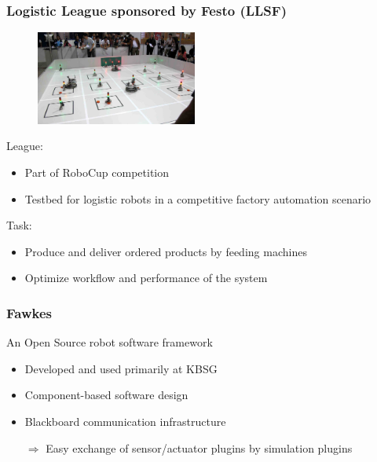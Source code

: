\documentclass[]{beamer}
\begin{document}
\begin{frame}
\frametitle{Logistic League sponsored by Festo (LLSF)}
\fboxsep=0pt
\noindent%
\begin{minipage}[]{0.48\linewidth}
\begin{figure}
\includegraphics[width=150pt,heigth=120pt]{pics/llsfLeague.png}\\
\end{figure}
\end{minipage}%
\hfill%
\begin{minipage}[]{0.48\linewidth}
League:
\begin{itemize}
\item Part of RoboCup competition
\item Testbed for logistic robots in a competitive factory automation scenario
\end{itemize}
\pause
Task:
\begin{itemize}
\item Produce and deliver ordered products by feeding machines%
\item Optimize workflow and performance of the system
\end{itemize}
\end{minipage}
\end{frame}

\begin{frame}
\frametitle{Fawkes}
An Open Source robot software framework
\begin{itemize}
\item Developed and used primarily at KBSG
\item Component-based software design
\item Blackboard communication infrastructure%
\pause
\item[$\Rightarrow$] Easy exchange of sensor/actuator plugins by simulation plugins
\end{itemize}
\end{frame}
\end{document}
